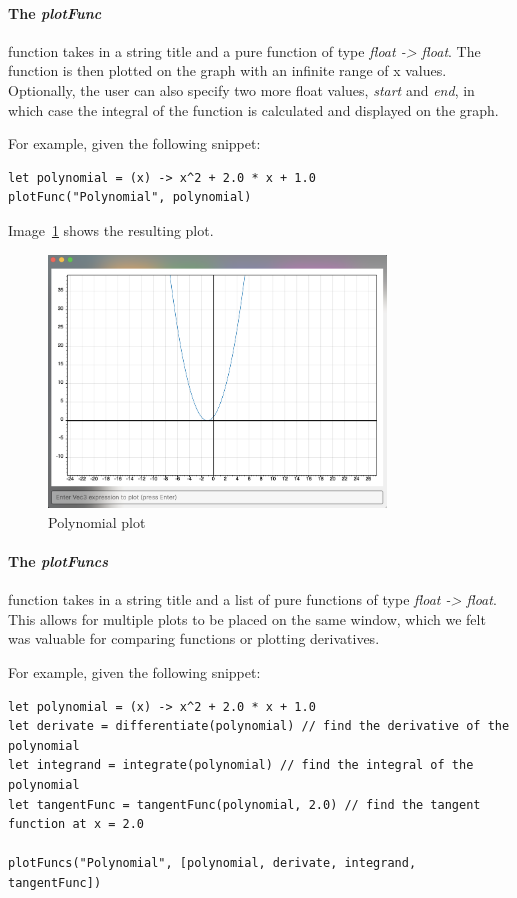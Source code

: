 \paragraph{The \textit{plotFunc}} function takes in a string title and a pure function of type \textit{float -> float}.
The function is then plotted on the graph with an infinite range of x values.
Optionally, the user can also specify two more float values, \textit{start} and \textit{end}, in which case the 
integral of the function is calculated and displayed on the graph.

For example, given the following snippet:

\begin{verbatim}
let polynomial = (x) -> x^2 + 2.0 * x + 1.0
plotFunc("Polynomial", polynomial)
\end{verbatim}

Image~\ref{fig:polynomial-plot} shows the resulting plot.

\begin{figure}[H]
    \centering
    \includegraphics[width=0.8\textwidth]{polynomialPlot}
    \caption{Polynomial plot}\label{fig:polynomial-plot}
\end{figure}

\paragraph{The \textit{plotFuncs}} function takes in a string title and a list of pure functions of type 
\textit{float -> float}.
This allows for multiple plots to be placed on the same window, which we felt was valuable for comparing functions 
or plotting derivatives.

For example, given the following snippet:

\begin{verbatim}
let polynomial = (x) -> x^2 + 2.0 * x + 1.0
let derivate = differentiate(polynomial) // find the derivative of the polynomial
let integrand = integrate(polynomial) // find the integral of the polynomial
let tangentFunc = tangentFunc(polynomial, 2.0) // find the tangent function at x = 2.0

plotFuncs("Polynomial", [polynomial, derivate, integrand, tangentFunc])
\end{verbatim}

